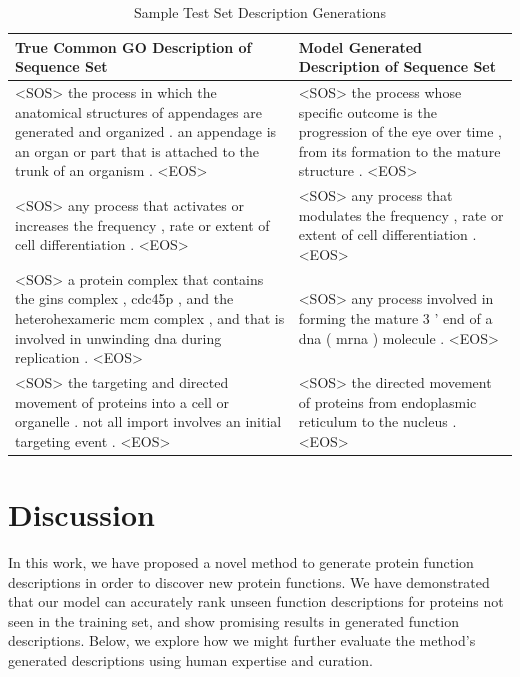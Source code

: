 \documentclass{article}
\begin{document}
\begin{table}
	\caption{Sample Test Set Description Generations}
	\centering
    \begin{tabular}{p{8 cm}|p{8 cm}}
		\toprule
        True Common GO Description of Sequence Set & Model Generated Description of Sequence Set \\
		\midrule
        <SOS> the process in which the anatomical structures of appendages are generated and organized . an appendage is an organ or part that is attached to the trunk of an organism . <EOS> & <SOS> the process whose specific outcome is the progression of the eye over time , from its formation to the mature structure . <EOS> \\ \hline
        <SOS> any process that activates or increases the frequency , rate or extent of cell differentiation . <EOS> & <SOS> any process that modulates the frequency , rate or extent of cell differentiation . <EOS> \\ \hline
		<SOS> a protein complex that contains the gins complex , cdc45p , and the heterohexameric mcm complex , and that is involved in unwinding dna during replication . <EOS> & <SOS> any process involved in forming the mature 3 ' end of a dna ( mrna ) molecule . <EOS> \\
        \hline
        <SOS> the targeting and directed movement of proteins into a cell or organelle . not all import involves an initial targeting event . <EOS> & <SOS> the directed movement of proteins from endoplasmic reticulum to the nucleus . <EOS>  \\
		\bottomrule
	\end{tabular}
    \label{tab:descriptions}
\end{table}

\section{Discussion}
In this work, we have proposed a novel method to generate protein function descriptions in order to discover new protein functions.
We have demonstrated that our model can accurately rank unseen function descriptions for proteins not seen in the training set, and show promising results in generated function descriptions.
Below, we explore how we might further evaluate the method's generated descriptions using human expertise and curation.
\end{document}
